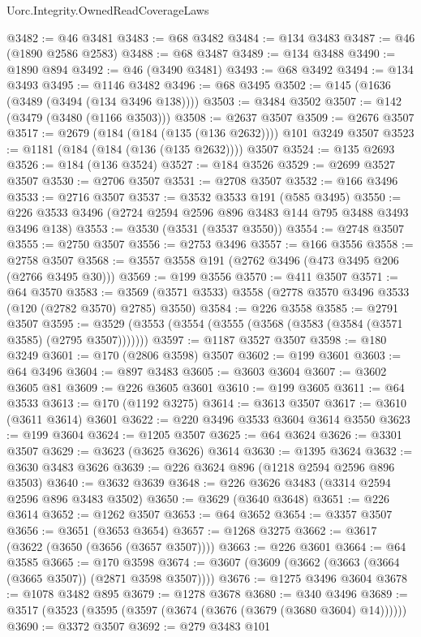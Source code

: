 \begin{lexlean}{Uorc.Integrity.OwnedReadCoverageLaws}
\begin{coremodule}
@3482 := @46 @3481
@3483 := @68 @3482
@3484 := @134 @3483
@3487 := @46 (@1890 @2586 @2583)
@3488 := @68 @3487
@3489 := @134 @3488
@3490 := @1890 @894
@3492 := @46 (@3490 @3481)
@3493 := @68 @3492
@3494 := @134 @3493
@3495 := @1146 @3482
@3496 := @68 @3495
@3502 := @145 (@1636 (@3489 (@3494 (@134 @3496 @138))))
@3503 := @3484 @3502
@3507 := @142 (@3479 (@3480 (@1166 @3503)))
@3508 := @2637 @3507
@3509 := @2676 @3507
@3517 := @2679 (@184 (@184 (@135 (@136 @2632)))) @101 @3249 @3507
@3523 := @1181 (@184 (@184 (@136 (@135 @2632)))) @3507
@3524 := @135 @2693
@3526 := @184 (@136 @3524)
@3527 := @184 @3526
@3529 := @2699 @3527 @3507
@3530 := @2706 @3507
@3531 := @2708 @3507
@3532 := @166 @3496
@3533 := @2716 @3507
@3537 := @3532 @3533 @191 (@585 @3495)
@3550 := @226 @3533 @3496 (@2724 @2594 @2596 @896 @3483 @144 @795 @3488 @3493 @3496 @138)
@3553 := @3530 (@3531 (@3537 @3550))
@3554 := @2748 @3507
@3555 := @2750 @3507
@3556 := @2753 @3496
@3557 := @166 @3556
@3558 := @2758 @3507
@3568 := @3557 @3558 @191 (@2762 @3496 (@473 @3495 @206 (@2766 @3495 @30)))
@3569 := @199 @3556
@3570 := @411 @3507
@3571 := @64 @3570
@3583 := @3569 (@3571 @3533) @3558 (@2778 @3570 @3496 @3533 (@120 (@2782 @3570) @2785) @3550)
@3584 := @226 @3558
@3585 := @2791 @3507
@3595 := @3529 (@3553 (@3554 (@3555 (@3568 (@3583 (@3584 (@3571 @3585) (@2795 @3507)))))))
@3597 := @1187 @3527 @3507
@3598 := @180 @3249
@3601 := @170 (@2806 @3598) @3507
@3602 := @199 @3601
@3603 := @64 @3496
@3604 := @897 @3483
@3605 := @3603 @3604
@3607 := @3602 @3605 @81
@3609 := @226 @3605 @3601
@3610 := @199 @3605
@3611 := @64 @3533
@3613 := @170 (@1192 @3275)
@3614 := @3613 @3507
@3617 := @3610 (@3611 @3614) @3601
@3622 := @220 @3496 @3533 @3604 @3614 @3550
@3623 := @199 @3604
@3624 := @1205 @3507
@3625 := @64 @3624
@3626 := @3301 @3507
@3629 := @3623 (@3625 @3626) @3614
@3630 := @1395 @3624
@3632 := @3630 @3483 @3626
@3639 := @226 @3624 @896 (@1218 @2594 @2596 @896 @3503)
@3640 := @3632 @3639
@3648 := @226 @3626 @3483 (@3314 @2594 @2596 @896 @3483 @3502)
@3650 := @3629 (@3640 @3648)
@3651 := @226 @3614
@3652 := @1262 @3507
@3653 := @64 @3652
@3654 := @3357 @3507
@3656 := @3651 (@3653 @3654)
@3657 := @1268 @3275
@3662 := @3617 (@3622 (@3650 (@3656 (@3657 @3507))))
@3663 := @226 @3601
@3664 := @64 @3585
@3665 := @170 @3598
@3674 := @3607 (@3609 (@3662 (@3663 (@3664 (@3665 @3507)) (@2871 @3598 @3507))))
@3676 := @1275 @3496 @3604
@3678 := @1078 @3482 @895
@3679 := @1278 @3678
@3680 := @340 @3496
@3689 := @3517 (@3523 (@3595 (@3597 (@3674 (@3676 (@3679 (@3680 @3604) @14))))))
@3690 := @3372 @3507
@3692 := @279 @3483 @101

\end{coremodule}
\end{lexlean}
